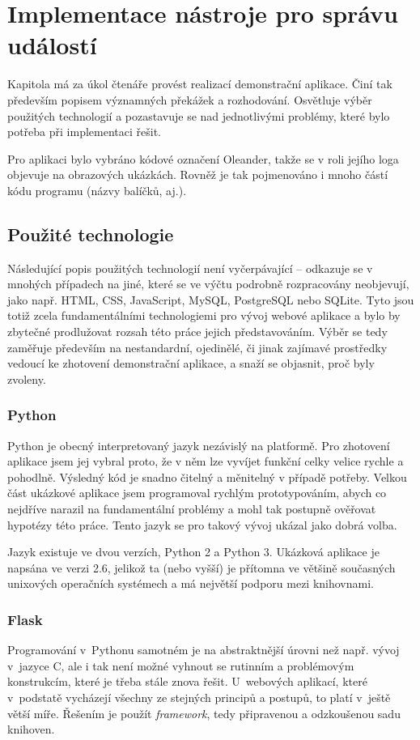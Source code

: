 \documentclass[12pt,oneside,final]{fithesis2}
\begin{document}
\chapter{Implementace nástroje pro správu událostí}
Kapitola má za úkol čtenáře provést realizací demonstrační aplikace. Činí tak především popisem významných překážek a rozhodování. Osvětluje výběr použitých technologií a pozastavuje se nad jednotlivými problémy, které bylo potřeba při implementaci řešit.

Pro aplikaci bylo vybráno kódové označení Oleander, takže se v roli jejího loga objevuje na obrazových ukázkách. Rovněž je tak pojmenováno i mnoho částí kódu programu (názvy balíčků, aj.).

\section{Použité technologie}
Následující popis použitých technologií není vyčerpávající -- odkazuje se v mnohých případech na jiné, které se ve výčtu podrobně rozpracovány neobjevují, jako např. HTML, CSS, JavaScript, MySQL, PostgreSQL nebo SQLite. Tyto jsou totiž zcela fundamentálními technologiemi pro vývoj webové aplikace a bylo by zbytečné prodlužovat rozsah této práce jejich představováním. Výběr se tedy zaměřuje především na nestandardní, ojedinělé, či jinak zajímavé prostředky vedoucí ke zhotovení demonstrační aplikace, a snaží se objasnit, proč byly zvoleny.

\subsection{Python}
Python je obecný interpretovaný jazyk nezávislý na platformě. Pro zhotovení aplikace jsem jej vybral proto, že v něm lze vyvíjet funkční celky velice rychle a pohodlně. Výsledný kód je snadno čitelný a měnitelný v případě potřeby. Velkou část ukázkové aplikace jsem programoval rychlým prototypováním, abych co nejdříve narazil na fundamentální problémy a mohl tak postupně ověřovat hypotézy této práce. Tento jazyk se pro takový vývoj ukázal jako dobrá volba.

Jazyk existuje ve dvou verzích, Python 2 a Python 3. Ukázková aplikace je napsána ve verzi 2.6, jelikož ta (nebo vyšší) je přítomna ve většině současných unixových operačních systémech a má největší podporu mezi knihovnami.

\subsection{Flask}
Programování v~Pythonu samotném je na abstraktnější úrovni než např. vývoj v~jazyce C, ale i tak není možné vyhnout se rutinním a problémovým konstrukcím, které je třeba stále znova řešit. U~webových aplikací, které v~podstatě vycházejí všechny ze stejných principů a postupů, to platí v~ještě větší míře. Řešením je použít \emph{framework}, tedy připravenou a odzkoušenou sadu knihoven.
\end{document}
